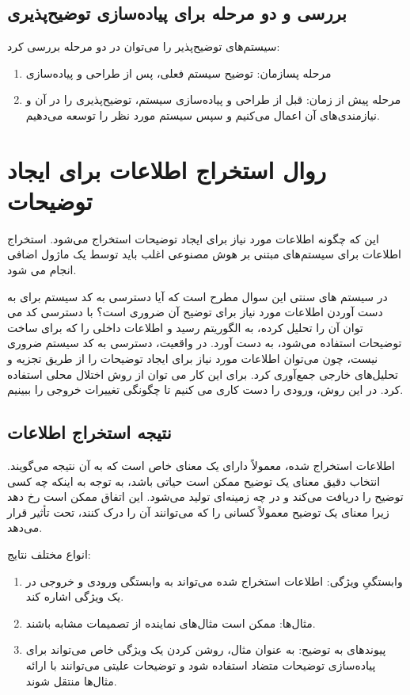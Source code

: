 \subsection{بررسی و دو مرحله برای پیاده‌سازی توضیح‌پذیری}

سیستم‌های توضیح‌پذیر را می‌توان در دو مرحله بررسی کرد:

\begin{enumerate}
    \item مرحله پسازمان: توضیح سیستم فعلی، پس از طراحی و پیاده‌سازی
    \item مرحله پیش از زمان: قبل از طراحی و پیاده‌سازی سیستم، توضیح‌پذیری را در
    آن و نیازمندی‌های آن اعمال می‌کنیم و سپس سیستم مورد نظر را توسعه می‌دهیم.
\end{enumerate}

\section{روال استخراج اطلاعات برای ایجاد توضیحات}
این که چگونه اطلاعات مورد نیاز برای ایجاد توضیحات استخراج می‌شود. استخراج
اطلاعات برای سیستم‌های مبتنی بر هوش مصنوعی اغلب باید توسط یک ماژول اضافی انجام
می شود.

در سیستم های سنتی این سوال مطرح است که آیا دسترسی به کد سیستم برای به دست آوردن
اطلاعات مورد نیاز برای توضیح آن ضروری است؟ با دسترسی کد می توان آن را تحلیل
کرده، به الگوریتم رسید و اطلاعات داخلی را که برای ساخت توضیحات استفاده می‌شود،
به دست آورد.  در واقعیت، دسترسی به کد سیستم ضروری نیست، چون می‌توان اطلاعات مورد
نیاز برای ایجاد توضیحات را از طریق تجزیه و تحلیل‌های خارجی جمع‌آوری کرد. برای
این کار می توان از روش اختلال محلی استفاده کرد. در این روش، ورودی را دست کاری می
کنیم تا چگونگی تغییرات خروجی را ببینیم.

\subsection{نتیجه استخراج اطلاعات}

اطلاعات استخراج شده، معمولاً دارای یک معنای خاص است که به آن نتیجه می‌گویند.
انتخاب دقیق معنای یک توضیح ممکن است حیاتی باشد، به توجه به اینکه چه کسی توضیح را
دریافت می‌کند و در چه زمینه‌ای تولید می‌شود. این اتفاق ممکن است رخ دهد زیرا
معنای یک توضیح معمولاً کسانی را که می‌توانند آن را درک کنند، تحت تأثیر قرار
می‌دهد.

انواع مختلف نتایج:

\begin{enumerate}
    \item وابستگیِ ویژگی: اطلاعات استخراج شده می‌تواند به وابستگی ورودی و خروجی
    در یک ویژگی اشاره کند. 
    \item مثال‌ها: ممکن است مثال‌های نماینده از تصمیمات مشابه باشند.
    \item پیوندهای به توضیح: به عنوان مثال، روشن کردن یک ویژگی خاص می‌تواند برای
    پیاده‌سازی توضیحات متضاد استفاده شود و توضیحات علیتی می‌توانند با ارائه
    مثال‌ها منتقل شوند.
\end{enumerate}

